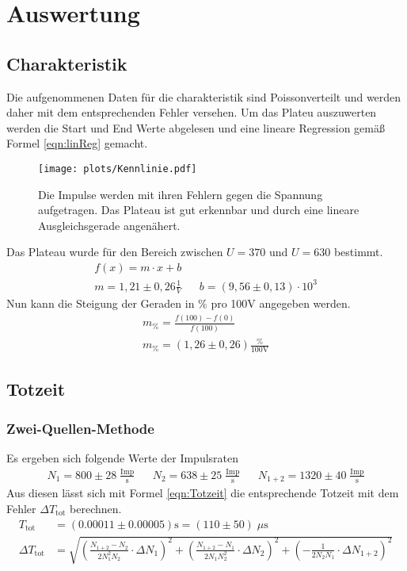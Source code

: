 \section{Auswertung}
\label{sec:Auswertung}
\subsection{Charakteristik}
Die aufgenommenen Daten für die charakteristik sind Poissonverteilt und werden daher mit dem entsprechenden Fehler versehen.
Um das Plateu auszuwerten werden die Start und End Werte abgelesen und eine lineare Regression gemäß Formel \ref{eqn:linReg} gemacht.
\begin{figure}
    \centering
    \texttt{[image: plots/Kennlinie.pdf]}
    \caption{Die Impulse werden mit ihren Fehlern gegen die Spannung aufgetragen. Das Plateau ist gut erkennbar und durch eine lineare Ausgleichsgerade angenähert. }
    \label{fig:Kennlinie}
\end{figure}
Das Plateau wurde für den Bereich zwischen $U = 370$ und $U = 630$ bestimmt.
\begin{align}
    f(x) = m\cdot x +b \label{eqn:linReg} \nonumber \\
    m = 1,21 \pm 0,26 \frac{1}{V}&& b = (9,56 \pm 0,13)\cdot 10^{3} \nonumber
\end{align}
Nun kann die Steigung der Geraden in \% pro  100V angegeben werden.
\begin{align}
    m_\% = \frac{f(100)-f(0)}{f(100)} \nonumber\\
    m_\% = (1,26 \pm 0,26)\frac{\%}{100\text{V}} \nonumber
\end{align}
\subsection{Totzeit}
\subsubsection{Zwei-Quellen-Methode}
Es ergeben sich folgende Werte der Impulsraten
\begin{align}
    N_1 = 800 \pm 28 \; \frac{\text{Imp}}{\text{s}} && N_2 = 638\pm 25 \; \frac{\text{Imp}}{\text{s}} && N_{1+2} = 1320 \pm 40 \; \frac{\text{Imp}}{\text{s}} \nonumber
\end{align}
Aus diesen lässt sich mit Formel \ref{eqn:Totzeit} die entsprechende Totzeit mit dem Fehler $\Delta T_{\text{tot}}$ berechnen.
\begin{align}
    T_{\text{tot}} &= (0.00011\pm 0.00005) \text{s} = (110 \pm 50)\; \mu \text{s} \nonumber \\
    \Delta T_{\text{tot}} &= \sqrt{ \left( \frac{N_{1+2}-N_2}{2N_1^2N_2} \cdot \Delta N_1 \right)^2 + \left( \frac{N_{1+2}-N_1}{2N_1N_2^2} \cdot \Delta N_2  \right)^2 + \left( -\frac{1}{2N_2N_1} \cdot \Delta N_{1+2}  \right)^2 } \nonumber
\end{align}

